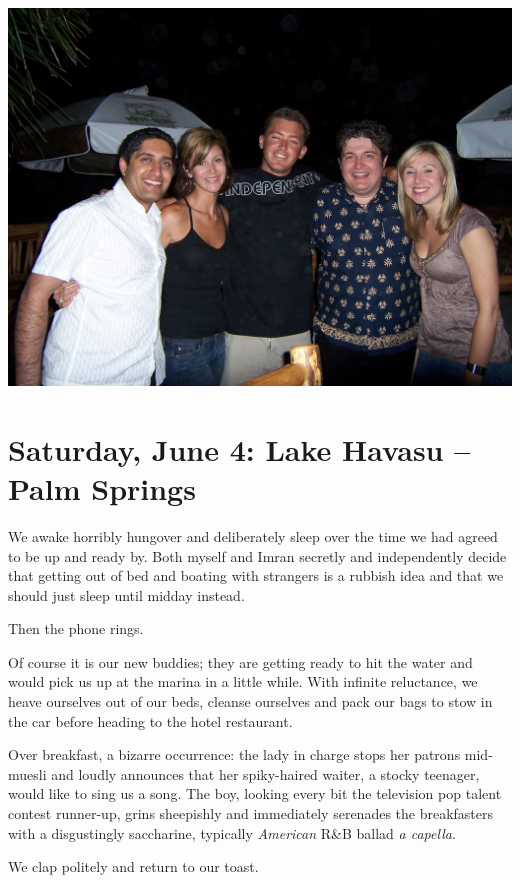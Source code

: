 \documentclass[a5paper,titlepage,11pt]{book}
\begin{document}
\begin{center}\includegraphics[width=\textwidth]{gfx/100_1579}\end{center}

\chapter[Lake Havasu -- Palm Springs]{Saturday, June 4:  Lake Havasu -- Palm Springs}
We awake horribly hungover and deliberately sleep over the time we had agreed to be up and ready by.  Both myself and Imran secretly and independently decide that getting out of bed and boating with strangers is a rubbish idea and that we should just sleep until midday instead.

Then the phone rings.

Of course it is our new buddies; they are getting ready to hit the water and would pick us up at the marina in a little while.  With infinite reluctance, we heave ourselves out of our beds, cleanse ourselves and pack our bags to stow in the car before heading to the hotel restaurant.

Over breakfast, a bizarre occurrence:  the lady in charge stops her patrons mid-muesli and loudly announces that her spiky-haired waiter, a stocky teenager, would like to sing us a song.  The boy, looking every bit the television pop talent contest runner-up, grins sheepishly and immediately serenades the breakfasters with a disgustingly saccharine, typically \emph{American} R\&B ballad \emph{a capella}.

We clap politely and return to our toast.
\end{document}
